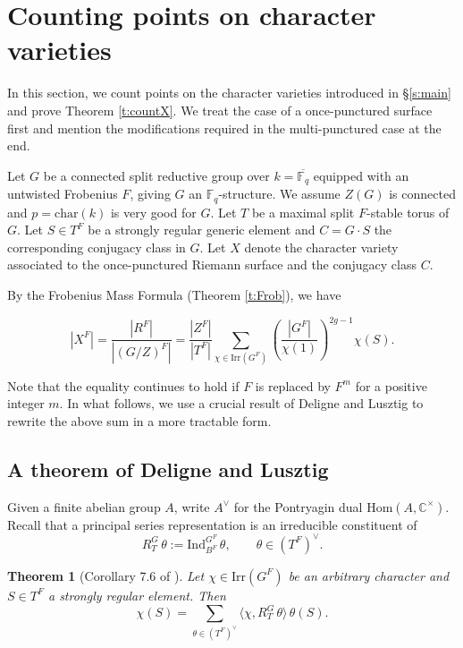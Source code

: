 \documentclass[12pt]{amsart}
\theoremstyle{plain}
\newtheorem{thm}{Theorem}
\theoremstyle{definition}
\theoremstyle{remark}
\newcommand{\bCt}{\mathbb{C}^\times}
\newcommand{\bR}{R}
\newcommand{\Irr}{\mathrm{Irr}}
\newcommand{\Hom}{\mathrm{Hom}}
\newcommand{\Fq}{\mathbb{F}_q}
\begin{document}
\section{Counting points on character varieties} \label{s:countX} 
In this section, we count points on the character varieties introduced in \S \ref{s:main} and prove Theorem \ref{t:countX}.   
We treat the case of a once-punctured surface first and mention the modifications required in the multi-punctured case at the end.  

Let $G$ be a connected split reductive group over $k=\overline{\Fq}$ equipped with an untwisted Frobenius $F$, giving $G$ an $\Fq$-structure.  We assume $Z(G)$ is connected and $p=\mathrm{char}(k)$ is very good for $G$. 
Let $T$ be a maximal split $F$-stable torus of $G$. Let $S\in T^F$ be a strongly regular generic element and $C=G\cdot S$ the corresponding conjugacy class in $G$. Let $X$ denote the character variety associated to the once-punctured Riemann surface and the conjugacy class $C$. 


By the Frobenius Mass Formula (Theorem \ref{t:Frob}), we have 

\begin{equation}\label{eq:Frob}
|X^F|=\frac{|\bR^F|}{|(G/Z)^F|} = \frac{|Z^F|}{|T^F|}\sum_{\chi\in \Irr(G^F)} \left(\frac{|G^F|}{\chi(1)}\right)^{2g-1} \chi(S). 
\end{equation} 

Note that the equality continues to hold if $F$ is replaced by $F^m$ for a positive integer $m$. 
In what follows, we use a crucial result of Deligne and Lusztig to rewrite the above sum in a more tractable form. 

\subsection{A theorem of Deligne and Lusztig} 
Given a finite abelian group $A$, write $A^\vee$ for the Pontryagin dual $\Hom(A, \bCt)$. 
Recall that a principal series representation is an irreducible constituent of 
\[
R_T^G\, \theta:=\mathrm{Ind}_{B^F}^{G^F}\, \theta,\qquad \theta \in (T^F)^\vee. 
\]


 \begin{thm}[Corollary 7.6 of \cite{DL76}] Let $\chi\in \Irr(G^F)$ be an arbitrary character and $S\in T^F$ a strongly regular element. Then 
 \[
 \chi(S) = \sum_{\theta \in (T^F)^\vee} \langle \chi, R_T^G\, \theta \rangle\, \theta(S). 
 \]
 \label{t:DL}
\end{thm} 
\end{document}
